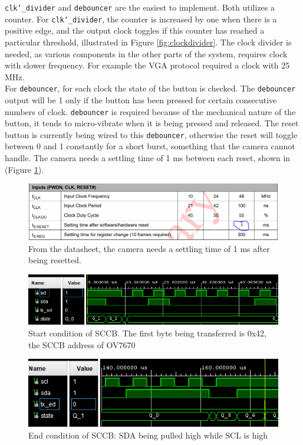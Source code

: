 \documentclass{article}
\begin{document}
	\texttt{clk\char`_divider} and \texttt{debouncer} are the easiest to implement. Both utilizes a counter. For \texttt{clk\char`_divider}, the counter is increased by one when there is a positive edge, and the output clock toggles if this counter has reached a particular threshold, illustrated in Figure \ref{fig:clockdivider}. The clock divider is needed, as various components in the other parts of the system, requires clock with slower frequency. For example the VGA protocol required a clock with 25 MHz.
	\\
	
	For \texttt{debouncer}, for each clock the state of the button is checked. The \texttt{debouncer} output will be 1 only if the button has been pressed for certain consecutive numbers of clock. \texttt{debouncer} is required because of the mechanical nature of the button, it tends to micro-vibrate when it is being pressed and released. The reset button is currently being wired to this \texttt{debouncer}, otherwise the reset will toggle between 0 and 1 constantly for a short burst, something that the camera cannot handle. The camera needs a settling time of 1 ms between each reset, shown in (Figure \ref{fig:setllingtime}).
	\begin{figure}[h]
		\centering
		\includegraphics[scale=0.55]{setllingtime}
		\caption{From the datasheet, the camera needs a settling time of 1 ms after being resetted.}
		\label{fig:setllingtime}
	\end{figure}
	
	\begin{figure}[h]
		\centering
		\includegraphics[scale=0.83]{sccb1}
		\caption{Start condition of SCCB. The first byte being transferred is 0x42, the SCCB address of OV7670}
		\label{fig:sccb1}
	\end{figure}
	\begin{figure}[h]
		\centering
		\includegraphics[scale=0.83]{sccb2}
		\caption{End condition of SCCB: SDA being pulled high while SCL is high}
		\label{fig:sccb2}
	\end{figure}
	\phantom{blabla}\\
	
\end{document}

